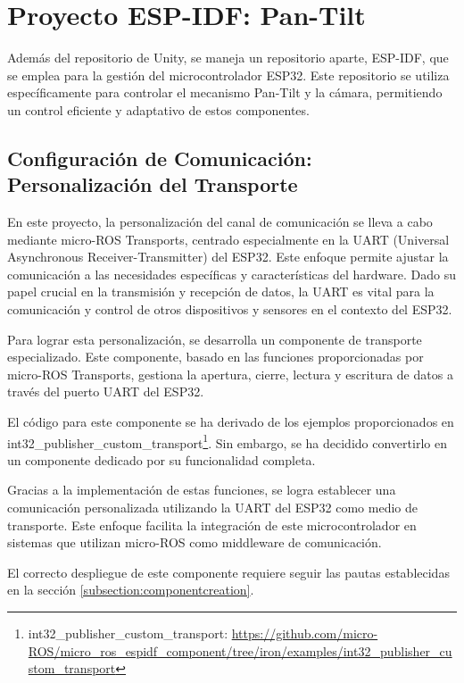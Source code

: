 \section{Proyecto ESP-IDF: Pan-Tilt}

Además del repositorio de Unity, se maneja un repositorio aparte, ESP-IDF, que se emplea para la gestión del microcontrolador ESP32. Este repositorio se utiliza específicamente para controlar el mecanismo Pan-Tilt y la cámara, permitiendo un control eficiente y adaptativo de estos componentes.

\subsection{Configuración de Comunicación: Personalización del Transporte}

En este proyecto, la personalización del canal de comunicación se lleva a cabo mediante micro-ROS Transports, centrado especialmente en la UART (Universal Asynchronous Receiver-Transmitter) del ESP32. Este enfoque permite ajustar la comunicación a las necesidades específicas y características del hardware. Dado su papel crucial en la transmisión y recepción de datos, la UART es vital para la comunicación y control de otros dispositivos y sensores en el contexto del ESP32.



Para lograr esta personalización, se desarrolla un componente de transporte especializado. Este componente, basado en las funciones proporcionadas por micro-ROS Transports, gestiona la apertura, cierre, lectura y escritura de datos a través del puerto UART del ESP32.



El código para este componente se ha derivado de los ejemplos proporcionados en int32\_publisher\_custom\_transport\footnote{int32\_publisher\_custom\_transport: \url{https://github.com/micro-ROS/micro\_ros\_espidf\_component/tree/iron/examples/int32\_publisher\_custom\_transport}}. Sin embargo, se ha decidido convertirlo en un componente dedicado por su funcionalidad completa.



Gracias a la implementación de estas funciones, se logra establecer una comunicación personalizada utilizando la UART del ESP32 como medio de transporte. Este enfoque facilita la integración de este microcontrolador en sistemas que utilizan micro-ROS como middleware de comunicación.



El correcto despliegue de este componente requiere seguir las pautas establecidas en la sección \ref{subsection:componentcreation}.




